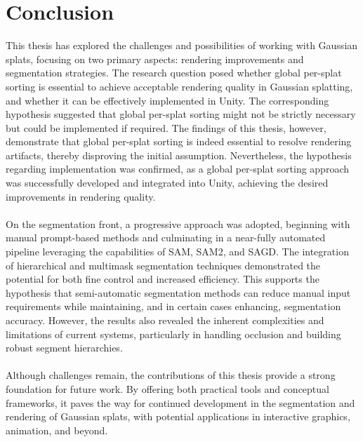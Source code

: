 \documentclass[12pt]{article}
\begin{document}
\section{Conclusion}
This thesis has explored the challenges and possibilities of working with Gaussian splats, focusing on two primary aspects: rendering improvements and segmentation strategies. The research question posed whether global per-splat sorting is essential to achieve acceptable rendering quality in Gaussian splatting, and whether it can be effectively implemented in Unity. The corresponding hypothesis suggested that global per-splat sorting might not be strictly necessary but could be implemented if required. The findings of this thesis, however, demonstrate that global per-splat sorting is indeed essential to resolve rendering artifacts, thereby disproving the initial assumption. Nevertheless, the hypothesis regarding implementation was confirmed, as a global per-splat sorting approach was successfully developed and integrated into Unity, achieving the desired improvements in rendering quality.
\\\\
On the segmentation front, a progressive approach was adopted, beginning with manual prompt-based methods and culminating in a near-fully automated pipeline leveraging the capabilities of SAM, SAM2, and SAGD. The integration of hierarchical and multimask segmentation techniques demonstrated the potential for both fine control and increased efficiency. This supports the hypothesis that semi-automatic segmentation methods can reduce manual input requirements while maintaining, and in certain cases enhancing, segmentation accuracy. However, the results also revealed the inherent complexities and limitations of current systems, particularly in handling occlusion and building robust segment hierarchies.
\\\\
Although challenges remain, the contributions of this thesis provide a strong foundation for future work. By offering both practical tools and conceptual frameworks, it paves the way for continued development in the segmentation and rendering of Gaussian splats, with potential applications in interactive graphics, animation, and beyond.
\FloatBarrier{}


\end{document}
